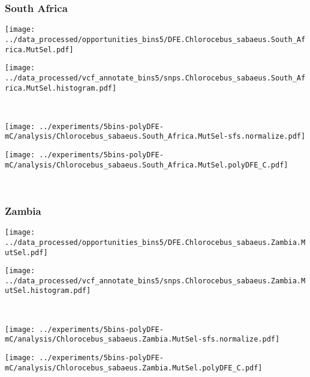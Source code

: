 \subsubsection{South Africa}

\begin{minipage}{0.49\linewidth}
    \texttt{[image: ../data\_processed/opportunities\_bins5/DFE.Chlorocebus\_sabaeus.South\_Africa.MutSel.pdf]}
\end{minipage}
\begin{minipage}{0.49\linewidth}
    \texttt{[image: ../data\_processed/vcf\_annotate\_bins5/snps.Chlorocebus\_sabaeus.South\_Africa.MutSel.histogram.pdf]}
\end{minipage}
\\
\begin{minipage}{0.49\linewidth}
    \texttt{[image: ../experiments/5bins-polyDFE-mC/analysis/Chlorocebus\_sabaeus.South\_Africa.MutSel-sfs.normalize.pdf]}
\end{minipage}
\begin{minipage}{0.49\linewidth}
    \texttt{[image: ../experiments/5bins-polyDFE-mC/analysis/Chlorocebus\_sabaeus.South\_Africa.MutSel.polyDFE\_C.pdf]}
\end{minipage}
\\

\subsubsection{Zambia}

\begin{minipage}{0.49\linewidth}
    \texttt{[image: ../data\_processed/opportunities\_bins5/DFE.Chlorocebus\_sabaeus.Zambia.MutSel.pdf]}
\end{minipage}
\begin{minipage}{0.49\linewidth}
    \texttt{[image: ../data\_processed/vcf\_annotate\_bins5/snps.Chlorocebus\_sabaeus.Zambia.MutSel.histogram.pdf]}
\end{minipage}
\\
\begin{minipage}{0.49\linewidth}
    \texttt{[image: ../experiments/5bins-polyDFE-mC/analysis/Chlorocebus\_sabaeus.Zambia.MutSel-sfs.normalize.pdf]}
\end{minipage}
\begin{minipage}{0.49\linewidth}
    \texttt{[image: ../experiments/5bins-polyDFE-mC/analysis/Chlorocebus\_sabaeus.Zambia.MutSel.polyDFE\_C.pdf]}
\end{minipage}
\\

